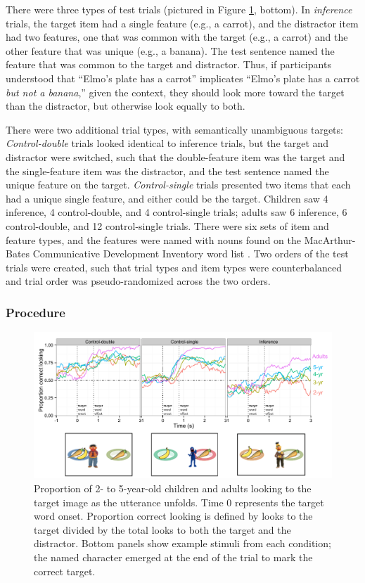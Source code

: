\documentclass[10pt,letterpaper]{article}
\begin{document}
There were three types of test trials (pictured in Figure \ref{fig:age}, bottom). In \emph{inference} trials, the target item had a single feature (e.g., a carrot), and the distractor item had two features, one that was common with the target (e.g., a carrot) and the other feature that was unique (e.g., a banana). The test sentence named the feature that was common to the target and distractor. Thus, if participants understood that ``Elmo's plate has a carrot'' implicates ``Elmo's plate has a carrot \emph{but not a banana},'' given the context, they should look more toward the target than the distractor, but otherwise look equally to both.

There were two additional trial types, with semantically unambiguous targets: \emph{Control-double} trials looked identical to inference trials, but the target and distractor were switched, such that the double-feature item was the target and the single-feature item was the distractor, and the test sentence named the unique feature on the target. \emph{Control-single} trials presented two items that each had a unique single feature, and either could be the target. Children saw 4 inference, 4 control-double, and 4 control-single trials; adults saw 6 inference, 6 control-double, and 12 control-single trials. 
There were six sets of item and feature types, and the features were named with nouns found on the  MacArthur-Bates Communicative Development Inventory word list \cite{fenson1994variability}. Two orders of the test trials were created, such that trial types and item types were counterbalanced and trial order was pseudo-randomized across the two orders.

\subsubsection{Procedure}


\begin{figure}[t]
\begin{center} 
  \includegraphics[width=.9\textwidth]{figures/expt1-accuracy.pdf}
  \caption{\label{fig:age} Proportion of 2- to 5-year-old children and adults looking to the target image as the utterance unfolds. Time 0 represents the target word onset. Proportion correct looking is defined by looks to the target divided by the total looks to both the target and the distractor. Bottom panels show example stimuli from each condition; the named character emerged at the end of the trial to mark the correct target.}
  \end{center} 
\end{figure}
\end{document}
